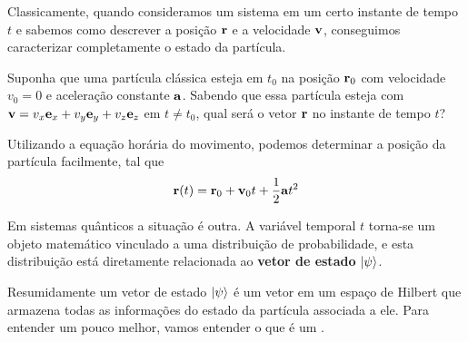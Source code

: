 Classicamente, quando consideramos um sistema em um certo instante de tempo $t$ e sabemos como descrever a posição $\vb{r}$ e a velocidade $\vb{v}$, conseguimos caracterizar completamente o estado da partícula. 
    \begin{example}\label{exemple 1.1}
        Suponha que uma partícula clássica esteja em $t_{0}$ na posição $\vb{r}_{0}$ com velocidade $v_{0}=0$ e aceleração constante $\vb{a}$. Sabendo que essa partícula esteja com $\vb{v}=v_{x}\vb{e}_{x}+v_{y}\vb{e}_{y}+v_{z}\vb{e}_{z}$ em $t\neq t_{0}$, qual será o vetor $\vb{r}$ no instante de tempo $t$?
        
        \divider
        
        Utilizando a equação horária do movimento, podemos determinar a posição da partícula facilmente, tal que
            \begin{equation*}
                \vb{r}(t) = \vb{r}_{0} + \vb{v}_{0}t + \dfrac{1}{2}\vb{a}t^2
            \end{equation*}
    \end{example}
    
Em sistemas quânticos a situação é outra. A variável temporal $t$ torna-se um objeto matemático vinculado a uma distribuição de probabilidade, e esta distribuição está diretamente relacionada ao \textbf{vetor de estado} $\ket{\psi}$.

Resumidamente um vetor de estado $\ket{\psi}$ é um vetor em um espaço de Hilbert que armazena todas as informações do estado da partícula associada a ele. Para entender um pouco melhor, vamos entender o que é um .

